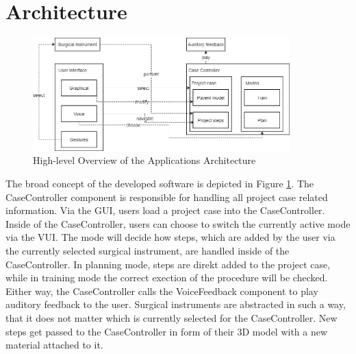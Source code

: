 \section{\label{sec::Architecture}Architecture}

\begin{figure}[ht]
    \centering
    \includegraphics[width=375px]{images/implementation/architecture.png}
    \caption{\label{fig::ImplementationArchitecture}High-level Overview of the Applications Architecture}
\end{figure}

The broad concept of the developed software is depicted in Figure \ref{fig::ImplementationArchitecture}.
The CaseController component is responsible for handling all project case related information.
Via the GUI, users load a project case into the CaseController.
Inside of the CaseController, users can choose to switch the currently active mode via the VUI.
The mode will decide how steps, which are added by the user via the currently selected surgical instrument, are handled inside of the CaseController.
In planning mode, steps are direkt added to the project case, while in training mode the correct exection of the procedure will be checked.
Either way, the CaseController calls the VoiceFeedback component to play auditory feedback to the user.
Surgical instruments are abstracted in such a way, that it does not matter which is currently selected for the CaseController.
New steps get passed to the CaseController in form of their 3D model with a new material attached to it.


